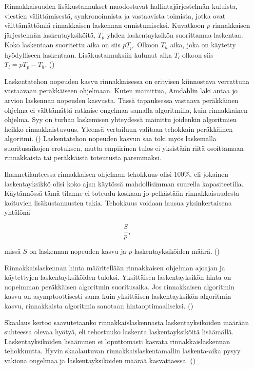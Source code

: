 Rinnakkaisuuden lisäkustannukset muodostuvat hallintajärjestelmän kuluista,
viestien välittämisestä, synkronoinnista ja vastaavista toimista, jotka ovat
välttämättömiä rinnakkaisen laskennan onnistumiseksi. Kuvatkoon $p$
rinnakkaisen järjestelmän laskentayksiköitä, $T_p$ yhden laskentayksikön
suorittamaa laskentaa. Koko laskentaan suoritettu aika on siis $pT_p$. Olkoon
$T_h$ aika, joka on käytetty hyödylliseen laskentaan. Lisäkustannuksiin kulunut
aika $T_l$ olkoon siis $T_l = pT_p - T_h$. (\citealt{intro})

Laskentatehon nopeuden kasvu rinnakkaisessa on erityisen kiinnostava verrattuna
vastaavaan peräkkäiseen ohjelmaan. Kuten mainittua, Amdahlin laki antaa jo
arvion laskennan nopeuden kasvusta. Tässä tapauksessa vastaava peräkkäinen ohjelma ei
välttämättä ratkaise ongelmaa samalla algoritmilla, kuin rinnakkainen ohjelma. Syy
on turhan laskemisen yhteydessä mainittu joidenkin algoritmien heikko rinnakkaistuvuus.
Yleensä vertailuun valitaan tehokkain peräkkäinen algoritmi. (\citealt{intro})
Laskentatehon nopeuden kasvun saa toki myös laskemalla suoritusaikojen erotuksen,
mutta empiirinen tulos ei yksistään riitä osoittamaan rinnakkaista tai peräkkäistä
toteutusta paremmaksi.

Ihannetilanteessa rinnakkaisen ohjelman tehokkuus olisi 100\%, eli jokainen
laskentayksikkö olisi koko ajan käytössä mahdollisimman suurella
kapasiteetilla. Käytännössä tämä tilanne ei toteudu koskaan jo pelkästään
rinnakkaisuudesta koituvien lisäkustannusten takia. Tehokkuus voidaan lausua
yksinkertaisena yhtälönä

\begin{center}
\begin{equation}\frac{S}{p},\end{equation}
\end{center}

missä $S$ on laskennan nopeuden kasvu ja $p$ laskentayksiköiden määrä. 
(\citealt{intro})

Rinnakkaislaskennan hinta määritellään rinnakkaisen ohjelman ajoajan ja
käytettyjen laskentayksiköiden tuloksi. Yksittäisen laskentayksikön hinta on
nopeimman peräkkäisen algoritmin suoritusaika. Jos rinnakkaisen algoritmin
kasvu on asymptoottisesti sama kuin yksittäisen laskentayksikön algoritmin kasvu,
rinnakkaista algoritmia sanotaan hintaoptimaaliseksi. (\citealt{intro})

Skaalaus kertoo saavutetaanko rinnakkaislaskennasta laskentayksiköiden määrään
suhteessa olevaa hyötyä, eli tehostuuko laskenta laskentayksiköitä lisäämällä.
Laskentayksiköiden lisääminen ei loputtomasti kasvata rinnakkaislaskennan
tehokkuutta. Hyvin skaalautuvan rinnakkaislaskentamallin laskenta-aika pysyy
vakiona ongelmaa ja laskentayksiköiden määrää kasvattaessa. (\citealt{rauber})

